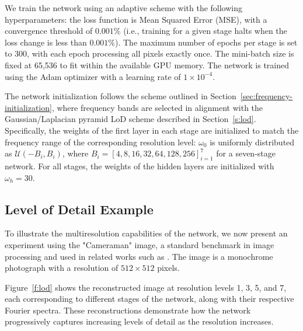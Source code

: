 We train the network using an adaptive scheme with the following hyperparameters: the loss function is Mean Squared Error (MSE), with a convergence threshold of \(0.001\%\) (i.e., training for a given stage halts when the loss change is less than \(0.001\%\)). The maximum number of epochs per stage is set to 300, with each epoch processing all pixels exactly once. The mini-batch size is fixed at 65,536 to fit within the available GPU memory. The network is trained using the Adam optimizer with a learning rate of \(1 \times 10^{-4}\).

The network initialization follows the scheme outlined in Section~\ref{sec:frequency-initialization}, where frequency bands are selected in alignment with the Gaussian/Laplacian pyramid LoD scheme described in Section~\ref{s:lod}. Specifically, the weights of the first layer in each stage are initialized to match the frequency range of the corresponding resolution level: \(\omega_0\) is uniformly distributed as \( \mathcal{U}(-B_i, B_i)\), where \( B_i = [4, 8, 16, 32, 64, 128, 256]_{i=1}^7 \) for a seven-stage network. For all stages, the weights of the hidden layers are initialized with \(\omega_h = 30\).


\subsection{Level of Detail Example}
\label{ss:LOD}

To illustrate the multiresolution capabilities of the network, we now present an experiment using the "Cameraman" image, a standard benchmark in image processing and used in related works such as \citet{sitzmann2019siren}. The image is a monochrome photograph with a resolution of \(512 \times 512\) pixels.

Figure~\ref{f:lod} shows the reconstructed image at resolution levels 1, 3, 5, and 7, each corresponding to different stages of the network, along with their respective Fourier spectra. These reconstructions demonstrate how the network progressively captures increasing levels of detail as the resolution increases.

